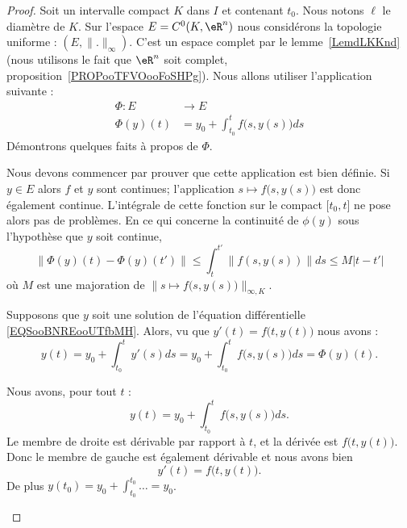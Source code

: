 \begin{proof}
	Soit un intervalle compact \( K\) dans \( I\) et contenant \( t_0\). Nous notons \( \ell\) le diamètre de \( K\). Sur l'espace \( E=C^0(K,\eR^n)\) nous considérons la topologie uniforme : \( (E,\| . \|_{\infty})\). C'est un espace complet par le lemme~\ref{LemdLKKnd} (nous utilisons le fait que \( \eR^n\) soit complet, proposition~\ref{PROPooTFVOooFoSHPg}). Nous allons utiliser l'application suivante :
	\begin{equation}        \label{EQooJUTBooILBKoE}
		\begin{aligned}
			\Phi\colon E & \to E                                  \\
			\Phi(y)(t)   & =y_0+\int_{t_0}^tf\big( s,y(s) \big)ds
		\end{aligned}
	\end{equation}
	Démontrons quelques faits à propos de \( \Phi\).
	\begin{subproof}
		Nous devons commencer par prouver que cette application est bien définie. Si \( y\in E\) alors \( f\) et \( y\) sont continues; l'application \( s\mapsto f\big(s,y(s)\big)\) est donc également continue. L'intégrale de cette fonction sur le compact \( \mathopen[ t_0 , t \mathclose]\) ne pose alors pas de problèmes. En ce qui concerne la continuité de \( \phi(y)\) sous l'hypothèse que \( y\) soit continue,
		\begin{equation}
			\| \Phi(y)(t)-\Phi(y)(t') \|\leq \int_t^{t'}\| f(s,y(s)) \|ds\leq M| t-t' |
		\end{equation}
		où \( M\) est une majoration de \( \| s\mapsto f\big( s,y(s) \big) \|_{\infty,K}\).

		\spitem[Si \( y\) est solution alors \( \Phi(y)=y\)]

		Supposons que \( y\) soit une solution de l'équation différentielle \eqref{EQSooBNREooUTfbMH}. Alors, vu que \( y'(t)=f\big( t,y(t) \big)\) nous avons :
		\begin{equation}
			y(t)=y_0+\int_{t_0}^ty'(s)ds=y_0+\int_{t_0}^tf\big( s,y(s) \big)ds=\Phi(y)(t).
		\end{equation}

		\spitem[Si \( \Phi(y)=y\) alors \( y\) est solution]

		Nous avons, pour tout \( t\) :
		\begin{equation}
			y(t)=y_0+\int_{t_0}^tf\big( s,y(s) \big)ds.
		\end{equation}
		Le membre de droite est dérivable par rapport à \( t\), et la dérivée est \( f\big( t,y(t) \big) \). Donc le membre de gauche est également dérivable et nous avons bien
		\begin{equation}
			y'(t)=f\big( t,y(t) \big).
		\end{equation}
		De plus \( y(t_0)=y_0+\int_{t_0}^{t_0}\ldots=y_0\).
	\end{subproof}


\end{proof}
